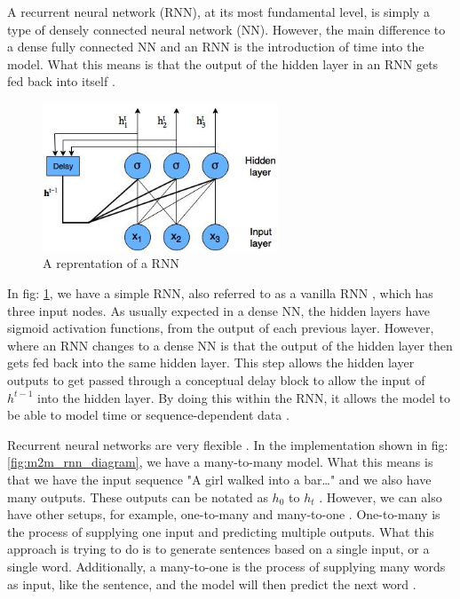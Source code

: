 \documentclass[a4paper,10pt]{article}
\begin{document}
	A recurrent neural network (RNN), at its most fundamental level, is simply a type of densely connected neural network (NN). However, the main difference to a dense fully connected NN and an RNN is the introduction of time into the model. What this means is that the output of the hidden layer in an RNN gets fed back into itself \cite{adv_in_ml, geron2019hands}.
	
	\begin{figure}
		\begin{center}
			\includegraphics[width=7cm]{explicit_RNN.jpg}
			\caption{A reprentation of a RNN \cite{adv_in_ml}}
			\label{fig:rnn_diagram}
		\end{center}
	\end{figure} 
	
	In fig: \ref{fig:rnn_diagram}, we have a simple RNN, also referred to as a vanilla RNN \cite{geron2019hands}, which has three input nodes. As usually expected in a dense NN, the hidden layers have sigmoid activation functions, from the output of each previous layer. However, where an RNN changes to a dense NN is that the output of the hidden layer then gets fed back into the same hidden layer. This step allows the hidden layer outputs to get passed through a conceptual delay block to allow the input of $h^{t-1}$ into the hidden layer. By doing this within the RNN, it allows the model to be able to model time or sequence-dependent data \cite{adv_in_ml, geron2019hands}.
	
	Recurrent neural networks are very flexible \cite{geron2019hands}. In the implementation shown in fig: \ref{fig:m2m_rnn_diagram}, we have a many-to-many model. What this means is that we have the input sequence "A girl walked into a bar…" and we also have many outputs. These outputs can be notated as $h_0$ to $h_t$ \cite{adv_in_ml}. However, we can also have other setups, for example, one-to-many and many-to-one \cite{jjslides}.  One-to-many is the process of supplying one input and predicting multiple outputs. What this approach is trying to do is to generate sentences based on a single input, or a single word. Additionally, a many-to-one is the process of supplying many words as input, like the sentence, and the model will then predict the next word \cite{adv_in_ml}.
	
\end{document}
